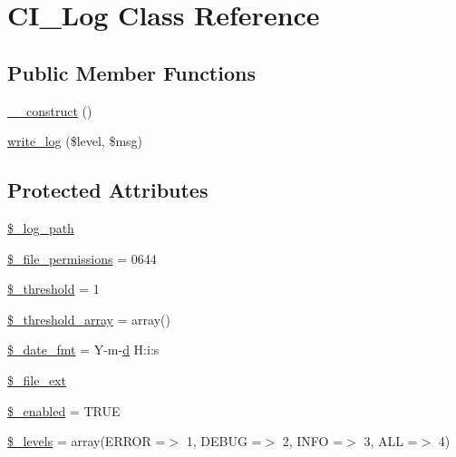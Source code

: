 \hypertarget{class_c_i___log}{}\section{C\+I\+\_\+\+Log Class Reference}
\label{class_c_i___log}
\subsection*{Public Member Functions}
\begin{DoxyCompactItemize}
\item 
\hyperlink{class_c_i___log_a095c5d389db211932136b53f25f39685}{\+\_\+\+\_\+construct} ()
\item 
\hyperlink{class_c_i___log_ae63dcdf6d5a7f494d7e401e3fc6da2b4}{write\+\_\+log} (\$level, \$msg)
\end{DoxyCompactItemize}
\subsection*{Protected Attributes}
\begin{DoxyCompactItemize}
\item 
\hyperlink{class_c_i___log_a3eaf9e92941ee6be33bc972ab76b4caf}{\$\+\_\+log\+\_\+path}
\item 
\hyperlink{class_c_i___log_a8a805f532669024e8868a5cca0d6f97b}{\$\+\_\+file\+\_\+permissions} = 0644
\item 
\hyperlink{class_c_i___log_a0fc9914bdaf300fa9a1745201204e73f}{\$\+\_\+threshold} = 1
\item 
\hyperlink{class_c_i___log_a95562d965f341c55d2c997ed12b4b721}{\$\+\_\+threshold\+\_\+array} = array()
\item 
\hyperlink{class_c_i___log_aab5c1870169c8e04ede18245f04ad85c}{\$\+\_\+date\+\_\+fmt} = \textquotesingle{}Y-\/m-\/\hyperlink{jquery_8canvasjs_8min_8js_a36541169dfff685f807208881a4f0021}{d} H\+:i\+:s\textquotesingle{}
\item 
\hyperlink{class_c_i___log_ad0c7fa3db6c5e41616bbdf4719492518}{\$\+\_\+file\+\_\+ext}
\item 
\hyperlink{class_c_i___log_af8233d47e8ad3e624ba168154d2f383d}{\$\+\_\+enabled} = T\+R\+U\+E
\item 
\hyperlink{class_c_i___log_aeb1c4747136537731b6cfed6f1e64941}{\$\+\_\+levels} = array(\textquotesingle{}E\+R\+R\+O\+R\textquotesingle{} =$>$ 1, \textquotesingle{}D\+E\+B\+U\+G\textquotesingle{} =$>$ 2, \textquotesingle{}I\+N\+F\+O\textquotesingle{} =$>$ 3, \textquotesingle{}A\+L\+L\textquotesingle{} =$>$ 4)
\end{DoxyCompactItemize}


